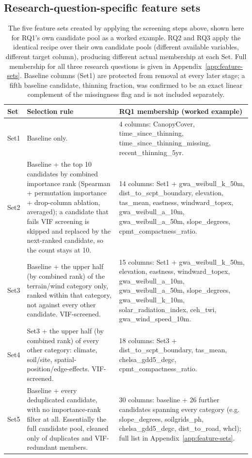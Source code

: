 \documentclass[11pt,a4paper]{report}
\begin{document}
\subsection{Research-question-specific feature sets}

\begin{table}[!htbp]
\centering
\scriptsize
\renewcommand{\arraystretch}{1.2}
\begin{tabular}{p{1cm}p{5.3cm}p{7.2cm}}
\toprule
Set & Selection rule & RQ1 membership (worked example) \\
\midrule
Set1 & Baseline only. & 4 columns: CanopyCover, time\_since\_thinning,
time\_since\_thinning\_missing, recent\_thinning\_5yr. \\
Set2 & Baseline + the top 10 candidates by combined importance rank (Spearman + permutation
importance + drop-column ablation, averaged); a candidate that fails VIF screening is skipped and
replaced by the next-ranked candidate, so the count stays at 10. & 14 columns: Set1 +
gwa\_weibull\_k\_50m, dist\_to\_scpt\_boundary, elevation, tas\_mean, eastness, windward\_topex,
gwa\_weibull\_a\_10m, gwa\_weibull\_a\_50m, slope\_degrees, cpmt\_compactness\_ratio. \\
Set3 & Baseline + the upper half (by combined rank) of the terrain/wind category only, ranked
within that category, not against every other candidate. VIF-screened. & 15 columns: Set1 +
gwa\_weibull\_k\_50m, elevation, eastness, windward\_topex, gwa\_weibull\_a\_10m,
gwa\_weibull\_a\_50m, slope\_degrees, gwa\_weibull\_k\_10m, solar\_radiation\_index, ceh\_twi,
gwa\_wind\_speed\_10m. \\
Set4 & Set3 + the upper half (by combined rank) of every other category: climate, soil/site,
spatial-position/edge-effects. VIF-screened. & 18 columns: Set3 + dist\_to\_scpt\_boundary,
tas\_mean, chelsa\_gdd5\_degc, cpmt\_compactness\_ratio. \\
Set5 & Baseline + every deduplicated candidate, with no importance-rank filter at all. Essentially
the full candidate pool, cleaned only of duplicates and VIF-redundant members. & 30
columns: baseline + 26 further candidates spanning every category (e.g. slope\_degrees,
soilgrids\_ph, chelsa\_gdd5\_degc, dist\_to\_road, whcl); full list in
Appendix~\ref{app:feature-sets}. \\
\bottomrule
\end{tabular}
\caption{The five feature sets created by applying the screening steps above, shown here for
RQ1's own candidate pool as a worked example. RQ2
and RQ3 apply the identical recipe over their own candidate pools (different available variables,
different target column), producing different actual membership at each Set. Full membership
for all three research questions is given in Appendix~\ref{app:feature-sets}. Baseline columns
(Set1) are protected from removal at every later stage; a fifth baseline candidate, thinning
fraction, was confirmed to be an exact linear complement of the missingness flag and is not
included separately.}
\label{tab:feature-sets-composition}
\end{table}
\end{document}
